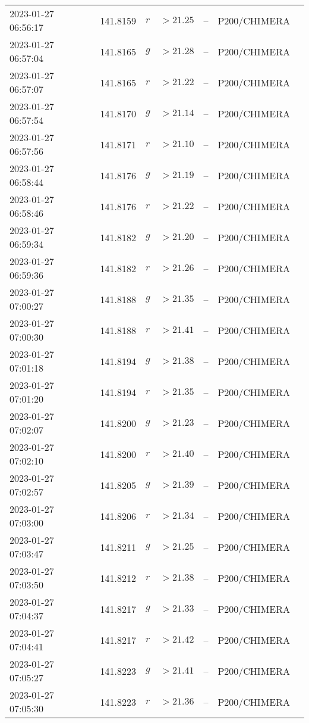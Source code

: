 \documentclass{nature_plusfigure}
\begin{document}
\begin{supplement}
\begin{center}
\begin{longtable}{lllllll}
2023-01-27 06:56:17 & 141.8159 & $r$ & $>21.25$ & -- & P200/CHIMERA &  \\ 
2023-01-27 06:57:04 & 141.8165 & $g$ & $>21.28$ & -- & P200/CHIMERA &  \\ 
2023-01-27 06:57:07 & 141.8165 & $r$ & $>21.22$ & -- & P200/CHIMERA &  \\ 
2023-01-27 06:57:54 & 141.8170 & $g$ & $>21.14$ & -- & P200/CHIMERA &  \\ 
2023-01-27 06:57:56 & 141.8171 & $r$ & $>21.10$ & -- & P200/CHIMERA &  \\ 
2023-01-27 06:58:44 & 141.8176 & $g$ & $>21.19$ & -- & P200/CHIMERA &  \\ 
2023-01-27 06:58:46 & 141.8176 & $r$ & $>21.22$ & -- & P200/CHIMERA &  \\ 
2023-01-27 06:59:34 & 141.8182 & $g$ & $>21.20$ & -- & P200/CHIMERA &  \\ 
2023-01-27 06:59:36 & 141.8182 & $r$ & $>21.26$ & -- & P200/CHIMERA &  \\ 
2023-01-27 07:00:27 & 141.8188 & $g$ & $>21.35$ & -- & P200/CHIMERA &  \\ 
2023-01-27 07:00:30 & 141.8188 & $r$ & $>21.41$ & -- & P200/CHIMERA &  \\ 
2023-01-27 07:01:18 & 141.8194 & $g$ & $>21.38$ & -- & P200/CHIMERA &  \\ 
2023-01-27 07:01:20 & 141.8194 & $r$ & $>21.35$ & -- & P200/CHIMERA &  \\ 
2023-01-27 07:02:07 & 141.8200 & $g$ & $>21.23$ & -- & P200/CHIMERA &  \\ 
2023-01-27 07:02:10 & 141.8200 & $r$ & $>21.40$ & -- & P200/CHIMERA &  \\ 
2023-01-27 07:02:57 & 141.8205 & $g$ & $>21.39$ & -- & P200/CHIMERA &  \\ 
2023-01-27 07:03:00 & 141.8206 & $r$ & $>21.34$ & -- & P200/CHIMERA &  \\ 
2023-01-27 07:03:47 & 141.8211 & $g$ & $>21.25$ & -- & P200/CHIMERA &  \\ 
2023-01-27 07:03:50 & 141.8212 & $r$ & $>21.38$ & -- & P200/CHIMERA &  \\ 
2023-01-27 07:04:37 & 141.8217 & $g$ & $>21.33$ & -- & P200/CHIMERA &  \\ 
2023-01-27 07:04:41 & 141.8217 & $r$ & $>21.42$ & -- & P200/CHIMERA &  \\ 
2023-01-27 07:05:27 & 141.8223 & $g$ & $>21.41$ & -- & P200/CHIMERA &  \\ 
2023-01-27 07:05:30 & 141.8223 & $r$ & $>21.36$ & -- & P200/CHIMERA &  \\ 

\end{longtable}
\end{center}
\end{supplement}
\end{document}
